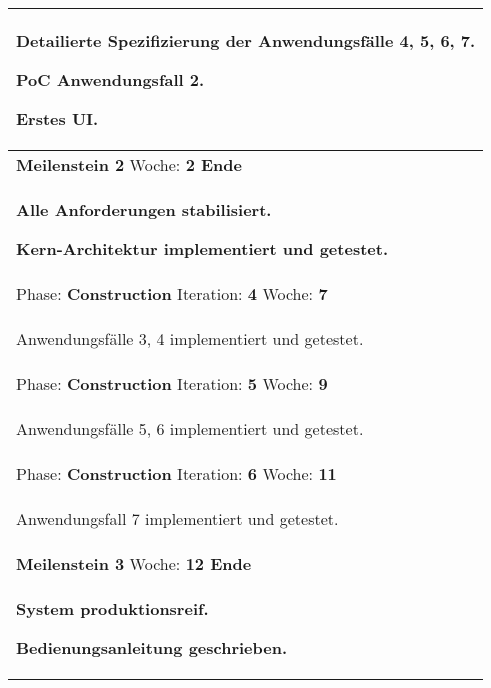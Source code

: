 \documentclass[11pt,ngerman]{article}
\begin{document}
\begin{table}[H]
\begin{tabularx}{\textwidth}{X}
\begin{compactitem}
                \item Detailierte Spezifizierung der Anwendungsfälle 4, 5, 6, 7.
                \item PoC Anwendungsfall 2.
                \item Erstes UI.
            \end{compactitem}\\
            \toprule
            \rowcolor{lightgray}
            \textbf{Meilenstein 2} Woche: \textbf{2 Ende}\\
            \rowcolor{lightgray}
            \begin{compactitem}
                \item \textbf{Alle Anforderungen stabilisiert.}
                \item \textbf{Kern-Architektur implementiert und getestet.}
            \end{compactitem}\\
            \toprule
            Phase: \textbf{Construction} Iteration: \textbf{4} Woche: \textbf{7}\\
            \begin{compactitem}
                \item Anwendungsfälle 3, 4 implementiert und getestet.
            \end{compactitem}\\
            \toprule
            Phase: \textbf{Construction} Iteration: \textbf{5} Woche: \textbf{9}\\
            \begin{compactitem}
                \item Anwendungsfälle 5, 6 implementiert und getestet.
            \end{compactitem}\\
            \toprule
            Phase: \textbf{Construction} Iteration: \textbf{6} Woche: \textbf{11}\\
            \begin{compactitem}
                \item Anwendungsfall 7 implementiert und getestet.
            \end{compactitem}\\
            \toprule
            \rowcolor{lightgray}
            \textbf{Meilenstein 3} Woche: \textbf{12 Ende}\\
            \rowcolor{lightgray}
            \begin{compactitem}
                \item \textbf{System produktionsreif.}
                \item \textbf{Bedienungsanleitung geschrieben.}
            \end{compactitem}\\
            \bottomrule
        \end{tabularx}
        \label{tab:Gesamtprojektplan}
    \end{table}
\end{document}

